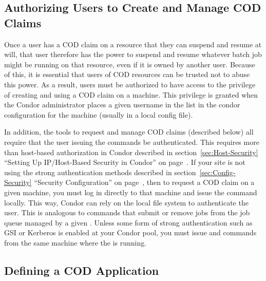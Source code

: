 \subsection{\label{sec:cod-authorizing}
Authorizing Users to Create and Manage COD Claims}

Once a user has a COD claim on a resource that they can suspend and
resume at will, that user therefore has the power to suspend and
resume whatever batch job might be running on that resource, even if
it is owned by another user.
Because of this, it is essential that users of COD resources can be
trusted not to abuse this power.
As a result, users must be authorized to have access to the privilege
of creating and using a COD claim on a machine.
This privilege is granted when the Condor administrator places a given
username in the  list in the condor
configuration for the machine (usually in a local config file).

In addition, the tools to request and manage COD claims (described
below) all require that the user issuing the commands be
authenticated. 
This requires more than host-based authorization in Condor described
in section~\ref{sec:Host-Security} ``Setting Up IP/Host-Based
Security in Condor'' on page~\pageref{sec:Host-Security}.
If your site is not using the strong authentication methods described
in section~\ref{sec:Config-Security} ``Security Configuration'' on
page~\pageref{sec:Config-Security}, then to request a COD claim on a
given machine, you must log in directly to that machine and issue the
command locally.
This way, Condor can rely on the local file system to authenticate the
user.
This is analogous to commands that submit or remove jobs from the job
queue managed by a given .
Unless some form of strong authentication such as GSI or Kerberos is
enabled at your Condor pool, you must issue  and
 commands from the same machine where the 
is running.


\subsection{\label{sec:cod-setup}
Defining a COD Application}

